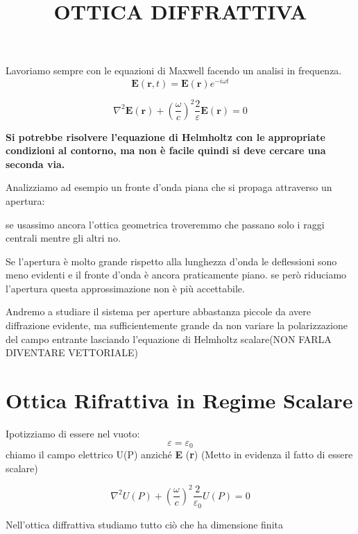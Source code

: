 \documentclass{article}
\title{OTTICA DIFFRATTIVA}
\author{}
\date{}
\begin{document}
\maketitle

Lavoriamo sempre con le equazioni di Maxwell facendo un analisi in frequenza.
\begin{equation}
\textbf{E}(\textbf{r}, t)= \textbf{E}(\textbf{r}) e^{-i \omega t}
\end{equation}

\begin{equation}
\nabla^2 \textbf{E} (\textbf{r}) + \left(\frac{\omega}{c}\right)^2 \frac{2}{\varepsilon} \textbf{E} (\textbf{r})=0
\end{equation}

\textbf{Si potrebbe risolvere l'equazione di Helmholtz con le appropriate condizioni al contorno, ma non è facile quindi si deve cercare una seconda via.}

Analizziamo ad esempio un fronte d'onda piana che si propaga attraverso un apertura:

 se usassimo ancora l'ottica geometrica troveremmo che passano solo i raggi centrali mentre gli altri no.


Se l'apertura è molto grande rispetto alla lunghezza d'onda le deflessioni sono meno evidenti e il fronte d'onda è ancora praticamente piano. se però riduciamo l'apertura questa approssimazione non è più accettabile.

Andremo a studiare il sistema per aperture abbastanza piccole da avere diffrazione evidente, ma sufficientemente grande da non variare la polarizzazione del campo entrante lasciando l'equazione di Helmholtz scalare(NON FARLA DIVENTARE VETTORIALE)

\section*{Ottica Rifrattiva in Regime Scalare}
Ipotizziamo di essere nel vuoto:
\begin{equation}
\varepsilon = \varepsilon_0
\end{equation}
chiamo il campo elettrico U(P) anziché \textbf{E} (\textbf{r}) 		(Metto in evidenza il fatto di essere scalare)

\begin{equation}
\nabla^2 U(P) + \left(\frac{\omega}{c}\right)^2 \frac{2}{\varepsilon _0}U(P)=0
\end{equation}

Nell'ottica diffrattiva studiamo tutto ciò che ha dimensione finita 
\end{document}
